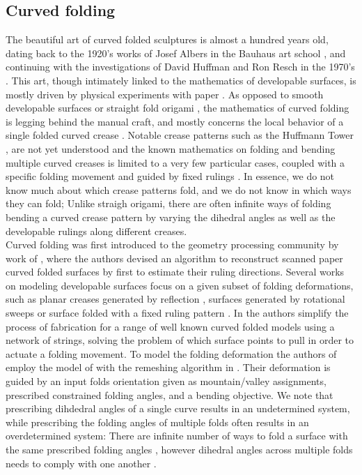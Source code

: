 \subsection{Curved folding}
The beautiful art of curved folded sculptures is almost a hundred years old, dating back to the 1920's works of Josef Albers in the Bauhaus art school \cite{josef_albers_thesis}, and continuing with the investigations of David Huffman and Ron Resch in the 1970's \cite{huffman,resch1974portfolio}. This art, though intimately linked to the mathematics of developable surfaces, is mostly driven by physical experiments with paper \cite{curved_review}. As opposed to smooth developable surfaces \cite{do_carmo} or straight fold origami \cite{origami_book}, the mathematics of curved folding is legging behind the manual craft, and mostly concerns the local behavior of a single folded curved crease \cite{duncan_folded,mathematical_omnibus,curved_review}. Notable crease patterns such as the Huffmann Tower \cite{huffman2,huffmann_reconstructing}, are not yet understood \cite{demaine2018conic} and the known mathematics on folding and bending multiple curved creases is limited to a very few particular cases, coupled with a specific folding movement and guided by fixed rulings \cite{demaine_lens, demaine2018conic}. In essence, we do not know much about which crease patterns fold, and we do not know in which ways they can fold; Unlike straigh origami, there are often infinite ways of folding bending a curved crease pattern by varying the dihedral angles as well as the developable rulings along different creases. \\
Curved folding was first introduced to the geometry processing community by work of \cite{curved_folding_kilian}, where the authors devised an algorithm to reconstruct scanned paper curved folded surfaces by first to estimate their ruling directions. Several works on modeling developable surfaces focus on a given subset of folding deformations, such as planar creases generated by reflection \cite{mitani2012column,Mitani_ref}, surfaces generated by rotational sweeps \cite{mitani2009design} or surface folded with a fixed ruling pattern \cite{pottmann_new}. In \cite{StringActuated:2017} the authors simplify the process of fabrication for a range of well known curved folded models using a network of strings, solving the problem of which surface points to pull in order to actuate a folding movement. To model the folding deformation the authors of \cite{StringActuated:2017} employ the model of \cite{botsch2006primo} with the remeshing algorithm in \cite{narain2012adaptive}. Their deformation is guided by an input folds orientation given as mountain/valley assignments, prescribed constrained folding angles, and a bending objective. We note that prescribing dihdedral angles of a single curve results in an undetermined system, while prescribing the folding angles of multiple folds often results in an overdetermined system: There are infinite number of ways to fold a surface with the same prescribed folding angles \cite{more_on_paper,duncan_folded}, however dihedral angles across multiple folds needs to comply with one another \cite{demaine2018conic}. \\
